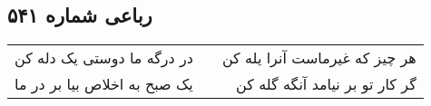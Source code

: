 \begin{center}
\section*{رباعی شماره ۵۴۱}
\label{sec:sh541}
\begin{longtable}{l p{0.5cm} r}
در درگه ما دوستی یک دله کن
&&
هر چیز که غیرماست آنرا یله کن
\\
یک صبح به اخلاص بیا بر در ما
&&
گر کار تو بر نیامد آنگه گله کن
\\
\end{longtable}
\end{center}
